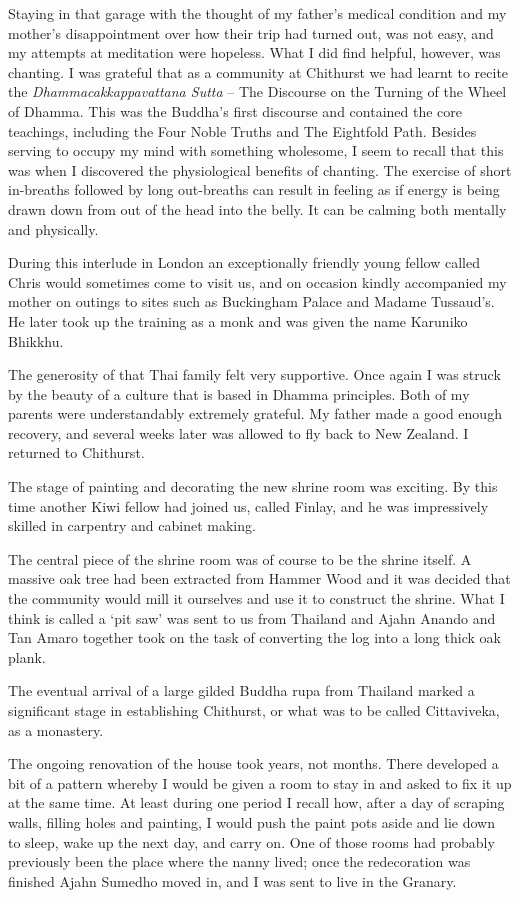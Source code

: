 Staying in that garage with the thought of my father's medical condition
and my mother's disappointment over how their trip had turned out, was
not easy, and my attempts at meditation were hopeless. What I did find
helpful, however, was chanting. I was grateful that as a community at
Chithurst we had learnt to recite the \emph{Dhammacakkappavattana Sutta}
-- The Discourse on the Turning of the Wheel of Dhamma. This was the
Buddha's first discourse and contained the core teachings, including the
Four Noble Truths and The Eightfold Path. Besides serving to occupy my
mind with something wholesome, I seem to recall that this was when I
discovered the physiological benefits of chanting. The exercise of short
in-breaths followed by long out-breaths can result in feeling as if
energy is being drawn down from out of the head into the belly. It can
be calming both mentally and physically.

During this interlude in London an exceptionally friendly young fellow
called Chris would sometimes come to visit us, and on occasion kindly
accompanied my mother on outings to sites such as Buckingham Palace and
Madame Tussaud's. He later took up the training as a monk and was given
the name Karuniko Bhikkhu.

The generosity of that Thai family felt very supportive. Once again I
was struck by the beauty of a culture that is based in Dhamma
principles. Both of my parents were understandably extremely grateful.
My father made a good enough recovery, and several weeks later was
allowed to fly back to New Zealand. I returned to Chithurst.

The stage of painting and decorating the new shrine room was exciting.
By this time another Kiwi fellow had joined us, called Finlay, and he was
impressively skilled in carpentry and cabinet making.

The central piece of the shrine room was of course to be the shrine
itself. A massive oak tree had been extracted from Hammer Wood and it
was decided that the community would mill it ourselves and use it to
construct the shrine. What I think is called a `pit saw' was sent to us
from Thailand and Ajahn Anando and Tan Amaro together took on the task
of converting the log into a long thick oak plank.

The eventual arrival of a large gilded Buddha rupa from Thailand marked
a significant stage in establishing Chithurst, or what was to be called
Cittaviveka, as a monastery.

The ongoing renovation of the house took years, not months. There
developed a bit of a pattern whereby I would be given a room to stay in
and asked to fix it up at the same time. At least during one period I
recall how, after a day of scraping walls, filling holes and painting, I
would push the paint pots aside and lie down to sleep, wake up the next
day, and carry on. One of those rooms had probably previously been the
place where the nanny lived; once the redecoration was finished Ajahn Sumedho moved
in, and I was sent to live in the Granary.

